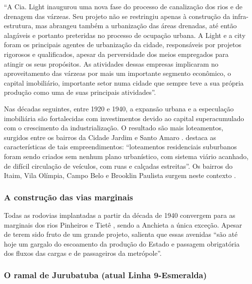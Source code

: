 \documentclass[
article,			%
11pt,				%
oneside,			%
a4paper,			%
english,			%
brazil,				%
sumario=tradicional
]{abntex2}
\begin{document}
	\begin{citacao}
		``A Cia. Light inaugurou uma nova fase do processo de canalização dos rios e de drenagem das várzeas. Seu projeto não se restringiu apenas à construção da infra-estrutura, mas abrangeu também a urbanização das áreas drenadas, até então alagáveis e portanto preteridas no processo de ocupação urbana. A Light e a \gls{city} foram os principais agentes de urbanização da cidade, responsáveis por projetos rigorosos e qualificados, apesar da perversidade dos meios empregados para atingir os seus propósitos. As atividades dessas empresas implicaram no aproveitamento das várzeas por mais um importante segmento econômico, o capital imobiliário, importante setor numa cidade que sempre teve a sua própria produção como uma de suas principais atividades''.
	\end{citacao}
	
	Nas décadas seguintes, entre 1920 e 1940, a expansão urbana e a especulação imobiliária são fortalecidas com investimentos devido ao capital superacumulado com o crescimento da industrialização. O resultado são mais loteamentos, surgidos entre os bairros da Cidade Jardim e Santo Amaro  .   destaca as características de tais empreendimentos: ``loteamentos residenciais suburbanos foram sendo criados sem nenhum plano urbanístico, com sistema viário acanhado, de difícil circulação de veículos, com ruas e calçadas estreitas''. Os bairros do Itaim, Vila Olímpia, Campo Belo e Brooklin Paulista surgem neste contexto .
	
	\subsubsection{A construção das vias marginais} \label{s3:construindo}
	
	Todas as rodovias implantadas a partir da década de 1940 convergem para as marginais dos rios Pinheiros e Tietê \cite[p. 12]{franco2005a}, sendo a Anchieta a única exceção. Apesar de terem sido fruto de um grande projeto,  salienta que essas avenidas ``são até hoje um gargalo do escoamento da produção do Estado e passagem obrigatória dos fluxos das cargas e de passageiros da metrópole''.
	
	\subsubsection{O ramal de Jurubatuba (atual Linha 9-Esmeralda)} \label{s3:linha9}
	
\end{document}

